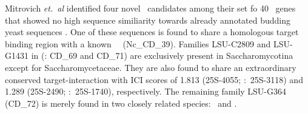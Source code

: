 %
%
%


Mitrovich \emph{et.~al} identified four novel \sno\ candidates among
their set fo 40 \sno\ genes that showed no high sequence similiarity
towards already annotated budding yeast sequences
\cite{Mitrovich:2010}. One of these sequences is found to share a
homologous target binding region with a known \ncr\ \sno\
(Nc\_CD\_39). Families LSU-C2809 and LSU-G1431 in
\cite{Mitrovich:2010} (\snostrip: CD\_69 and CD\_71) are exclusively
present in Saccharomycotina except for Saccharomycetaceae. They are
also found to share an extraordinary conserved target-interaction with
ICI scores of 1.813 (25S-4055; \calb:~25S-3118) and 1.289 (25S-2490;
\calb:~25S-1740), respectively. The remaining family LSU-G364 (CD\_72)
is merely found in two closely related species: \cdu\ and \ctr.



